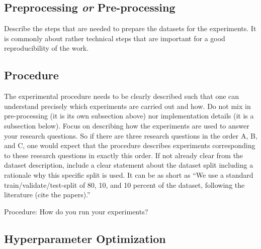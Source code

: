 \documentclass[manuscript, nonacm]{acmart}
\begin{document}
\subsection{Preprocessing \textit{or} Pre-processing}
\label{sec:preprocessing}

Describe the steps that are needed to prepare the datasets for the experiments.
It is commonly about rather technical steps that are important for a good reproducibility of the work.

\subsection{Procedure}
\label{sec:procedure}

\begin{tcolorbox}
    [title=Procedure: What needs to be described to understand the experiments.]
    The experimental procedure needs to be clearly described such that one can understand precisely which experiments are carried out and how. 
    Do not mix in pre-processing (it is its own subsection above) nor implementation details (it is a subsection below). 
    Focus on describing how the experiments are used to answer your research questions. 
    So if there are three research questions in the order A, B, and C, one would expect that the procedure describes experiments corresponding to these research questions in exactly this order. 
    If not already clear from the dataset description, include a clear statement about the dataset split including a rationale why this specific split is used. 
    It can be as short as ``We use a standard train/validate/test-split of 80, 10, and 10 percent of the dataset, following the literature (cite the papers).''

\end{tcolorbox}


Procedure: How do you run your experiments?

\subsection{Hyperparameter Optimization}
\label{sec:hyperparameteroptimization}

\end{document}

